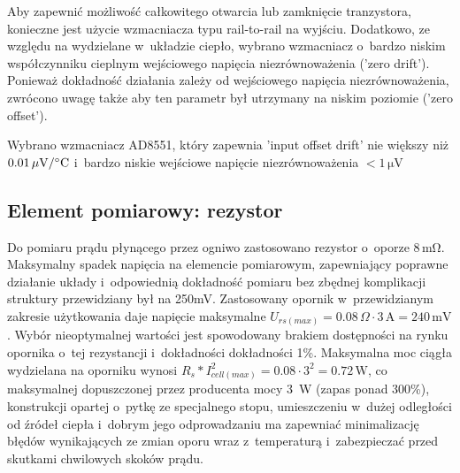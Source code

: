 \documentclass[polish,engineer]{polsl-msth}
\begin{document}
Aby zapewnić możliwość całkowitego otwarcia lub zamknięcie tranzystora, konieczne jest użycie wzmacniacza typu rail-to-rail na wyjściu. Dodatkowo, ze względu na wydzielane w~układzie ciepło, wybrano wzmacniacz o~bardzo niskim współczynniku cieplnym wejściowego napięcia niezrównoważenia ('zero drift'). Ponieważ dokładność działania zależy od wejściowego napięcia niezrównoważenia, zwrócono uwagę także aby ten parametr był utrzymany na niskim poziomie ('zero offset').

Wybrano wzmacniacz AD8551, który zapewnia 'input offset drift' nie większy niż $\mathrm{0.01\, \mu V/\degree C}$ i~bardzo niskie wejściowe napięcie niezrównoważenia $\mathrm{<1\,\mu V}$
\subsection{Element pomiarowy: rezystor}
Do pomiaru prądu płynącego przez ogniwo zastosowano rezystor o~oporze $\mathrm{8\,m\Omega}$. Maksymalny spadek napięcia na elemencie pomiarowym, zapewniający poprawne działanie układy i~odpowiednią dokładność pomiaru bez zbędnej komplikacji struktury przewidziany był na 250mV. Zastosowany opornik w~przewidzianym zakresie użytkowania daje napięcie maksymalne $U_{rs(max)}=0.08\,\Omega \cdot 3\,\mathrm{A = 240\,mV}$. Wybór nieoptymalnej wartości jest spowodowany brakiem dostępności na rynku opornika o~tej rezystancji i~dokładności dokładności 1\%. Maksymalna moc ciągła wydzielana na oporniku wynosi $R_s*I_{cell(max)}^2 = 0.08\cdot3^2 = 0.72\,\mathrm{W}$, co maksymalnej dopuszczonej przez producenta mocy 3~W (zapas ponad 300\%), konstrukcji opartej o~pytkę ze specjalnego stopu, umieszczeniu w~dużej odległości od źródeł ciepła i~dobrym jego odprowadzaniu ma zapewniać minimalizację błędów wynikających ze zmian oporu wraz z~temperaturą i~zabezpieczać przed skutkami chwilowych skoków prądu.
\end{document}
